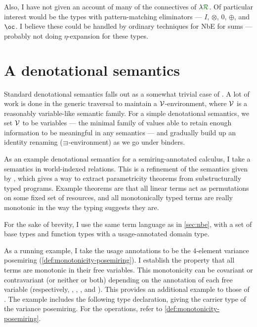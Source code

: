 Also, I have not given an account of many of the connectives of $\name$.
Of particular interest would be the types with pattern-matching eliminators ---
$I$, $\otimes$, $0$, $\oplus$, and $\oc$.
I believe these could be handled by ordinary techniques for NbE for sums ---
probably not doing $\eta$-expansion for these types.


\section{A denotational semantics}\label{sec:den-sem}

Standard denotational semantics falls out as a somewhat trivial case of
.
A lot of work is done in the generic traversal  to
maintain a $\mathcal V$-environment, where $\mathcal V$ is a reasonably variable-like semantic
family.
For a simple denotational semantics, we set $\mathcal V$ to be variables --- the minimal
family of values able to retain enough information to be meaningful in any
semantics --- and gradually build up an identity renaming ($\sqni$-environment)
as we go under binders.

As an example denotational semantics for a semiring-annotated calculus, I take
a semantics in world-indexed relations.
This is a refinement of the semantics given by \citet{AbelBernardy2020},
which gives a way to extract parametricity theorems from substructurally typed
programs.
Example theorems are that all linear terms act as permutations on some fixed
set of resources, and all monotonically typed terms are really monotonic in the
way the typing suggests they are.

For the sake of brevity, I use the same term language as in \cref{sec:nbe}, with
a set of base types and function types with a usage-annotated domain type.

As a running example, I take the usage annotations to be the 4-element
variance posemiring (\cref{def:monotonicity-posemiring}).
I establish the property that all terms are monotonic in their free variables.
This monotonicity can be covariant or contravariant (or neither or both)
depending on the annotation of each free variable (respectively,
\AgdaInductiveConstructor{$\uparrow\uparrow$},
\AgdaInductiveConstructor{$\downarrow\downarrow$},
\AgdaInductiveConstructor{$\wn\wn$}, and
\AgdaInductiveConstructor{\textasciitilde\textasciitilde}).
This provides an additional example to those of \citet{AbelBernardy2020}.
The example includes the following type declaration, giving the carrier type of
the variance posemiring.
For the operations, refer to \cref{def:monotonicity-posemiring}.

